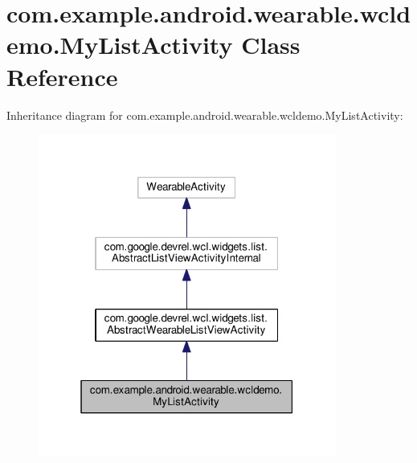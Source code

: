 \hypertarget{classcom_1_1example_1_1android_1_1wearable_1_1wcldemo_1_1MyListActivity}{}\section{com.\+example.\+android.\+wearable.\+wcldemo.\+My\+List\+Activity Class Reference}
\label{classcom_1_1example_1_1android_1_1wearable_1_1wcldemo_1_1MyListActivity}


Inheritance diagram for com.\+example.\+android.\+wearable.\+wcldemo.\+My\+List\+Activity\+:
\nopagebreak
\begin{figure}[H]
\begin{center}
\leavevmode
\includegraphics[width=277pt]{d0/d2e/classcom_1_1example_1_1android_1_1wearable_1_1wcldemo_1_1MyListActivity__inherit__graph}
\end{center}
\end{figure}



